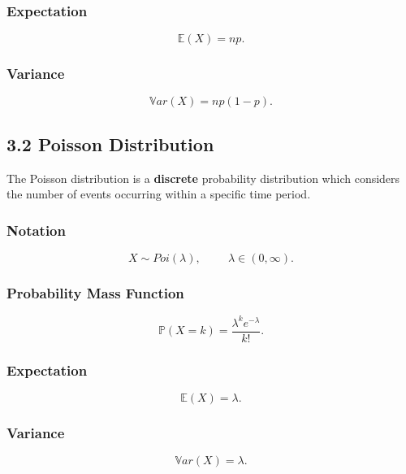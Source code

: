 \documentclass[11pt]{article}
\begin{document}
\subsubsection*{Expectation}
\begin{equation}
    \mathbb{E}(X) = np.
\end{equation}

\subsubsection*{Variance}
\begin{equation}
    \mathbb{V}ar(X) = np(1-p).
\end{equation}

\subsection*{3.2 Poisson Distribution}
The Poisson distribution is a \textbf{discrete} probability distribution which considers the number of events occurring within a specific time period.

\subsubsection*{Notation}
\begin{equation}
    X \sim Poi(\lambda), \hspace{1cm} \lambda \in (0,\infty).
\end{equation}

\subsubsection*{Probability Mass Function}
\begin{equation}
    \mathbb{P}(X = k) = \frac{\lambda^k e^{-\lambda}}{k!}.
\end{equation}

\subsubsection*{Expectation}
\begin{equation}
    \mathbb{E}(X) = \lambda.
\end{equation}

\subsubsection*{Variance}
\begin{equation}
    \mathbb{V}ar(X) = \lambda.
\end{equation}
\end{document}
